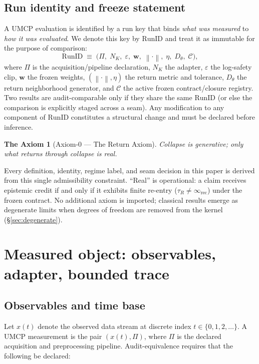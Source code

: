 \documentclass[
  aps,
  prd,
  preprint,
  superscriptaddress,
  nofootinbib,
  floatfix
]{revtex4-2}
\newcommand{\Rinf}{\infty_{\mathrm{rec}}}
\newcommand{\norm}[1]{\left\lVert #1 \right\rVert}
\newtheorem*{axiom}{The Axiom}
\begin{document}
\subsection{Run identity and freeze statement}
\label{subsec:runid}
A UMCP evaluation is identified by a run key that binds \emph{what was measured} to \emph{how it was evaluated}.
We denote this key by $\mathrm{RunID}$ and treat it as immutable for the purpose of comparison:
\begin{equation}
  \mathrm{RunID} \;\equiv\; \bigl(\Pi,\; N_K,\; \varepsilon,\; \bm{w},\; \norm{\cdot},\; \eta,\; D_\theta,\; \mathcal{C}\bigr),
\end{equation}
where $\Pi$ is the acquisition/pipeline declaration, $N_K$ the adapter, $\varepsilon$ the log-safety clip,
$\bm{w}$ the frozen weights, $(\norm{\cdot},\eta)$ the return metric and tolerance, $D_\theta$ the return neighborhood generator,
and $\mathcal{C}$ the active frozen contract/closure registry.
Two results are audit-comparable only if they share the same $\mathrm{RunID}$ (or else the comparison is explicitly staged across a seam).
Any modification to any component of $\mathrm{RunID}$ constitutes a structural change and must be declared before inference.
\begin{axiom}[Axiom-0 --- The Return Axiom]
\label{ax:return}
Collapse is generative; only what returns through collapse is real.
\end{axiom}

\noindent Every definition, identity, regime label, and seam decision in this paper is derived from this single
admissibility constraint. ``Real'' is operational: a claim receives epistemic credit if and only if
it exhibits finite re-entry ($\tau_R \neq \Rinf$) under the frozen contract.
No additional axiom is imported; classical results emerge as degenerate limits when degrees of freedom
are removed from the kernel (\S\ref{sec:degenerate}).

\section{Measured object: observables, adapter, bounded trace}

\subsection{Observables and time base}
Let $x(t)$ denote the observed data stream at discrete index $t\in\{0,1,2,\dots\}$.
A UMCP measurement is the pair $(x(t),\Pi)$, where $\Pi$ is the declared acquisition and preprocessing pipeline.
Audit-equivalence requires that the following be declared:
\end{document}
